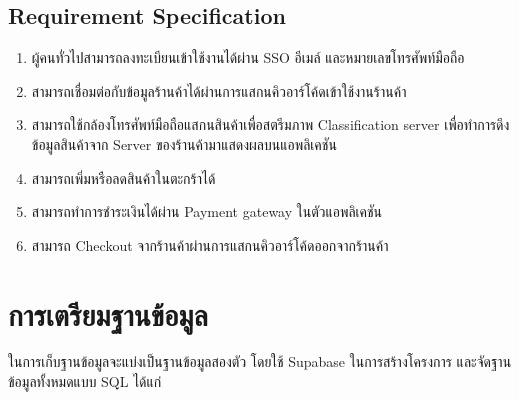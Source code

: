 \subsection{Requirement Specification}  

\begin{enumerate}
  \item ผู้คนทั่วไปสามารถลงทะเบียนเข้าใช้งานได้ผ่าน SSO อีเมล์ และหมายเลขโทรศัพท์มือถือ
  \item สามารถเชื่อมต่อกับข้อมูลร้านค้าได้ผ่านการแสกนคิวอาร์โค้ดเข้าใช้งานร้านค้า
  \item สามารถใช้กล้องโทรศัพท์มือถือแสกนสินค้าเพื่อสตรีมภาพ Classification server เพื่อทำการดึงข้อมูลสินค้าจาก Server ของร้านค้ามาแสดงผลบนแอพลิเคชัน
  \item สามารถเพิ่มหรือลดสินค้าในตะกร้าได้
  \item สามารถทำการชำระเงินได้ผ่าน Payment gateway ในตัวแอพลิเคชัน
  \item สามารถ Checkout จากร้านค้าผ่านการแสกนคิวอาร์โค้ดออกจากร้านค้า
 
\end{enumerate}


\section{การเตรียมฐานข้อมูล}
ในการเก็บฐานข้อมูลจะแบ่งเป็นฐานข้อมูลสองตัว โดยใช้ Supabase 
ในการสร้างโครงการ และจัดฐานข้อมูลทั้งหมดแบบ SQL ได้แก่ 
